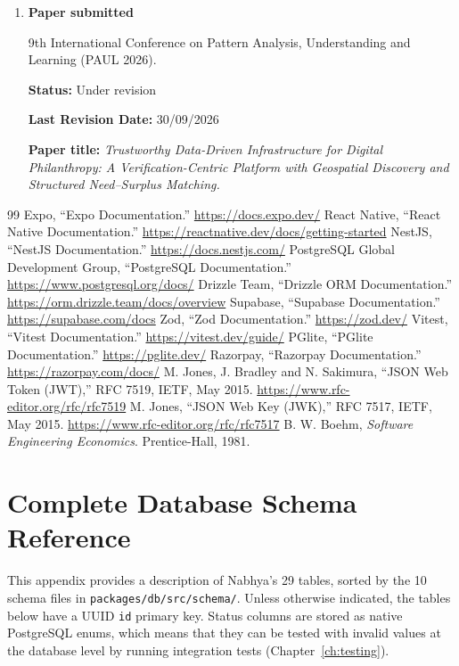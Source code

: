 \begin{enumerate}[leftmargin=*, label=\arabic*.]
  \item \textbf{Paper submitted}

  9th International Conference on Pattern Analysis, Understanding and Learning (PAUL 2026).

  \textbf{Status:} Under revision

  \textbf{Last Revision Date:} 30/09/2026

  \textbf{Paper title:} \textit{Trustworthy Data-Driven Infrastructure for Digital Philanthropy: A Verification-Centric Platform with Geospatial Discovery and Structured Need--Surplus Matching.}
\end{enumerate}

\clearpage{}
\begin{thebibliography}{99}
 Expo, ``Expo Documentation.'' \url{https://docs.expo.dev/}
 React Native, ``React Native Documentation.'' \url{https://reactnative.dev/docs/getting-started}
 NestJS, ``NestJS Documentation.'' \url{https://docs.nestjs.com/}
 PostgreSQL Global Development Group, ``PostgreSQL Documentation.'' \url{https://www.postgresql.org/docs/}
 Drizzle Team, ``Drizzle ORM Documentation.'' \url{https://orm.drizzle.team/docs/overview}
 Supabase, ``Supabase Documentation.'' \url{https://supabase.com/docs}
 Zod, ``Zod Documentation.'' \url{https://zod.dev/}
 Vitest, ``Vitest Documentation.'' \url{https://vitest.dev/guide/}
 PGlite, ``PGlite Documentation.'' \url{https://pglite.dev/}
 Razorpay, ``Razorpay Documentation.'' \url{https://razorpay.com/docs/}
 M. Jones, J. Bradley and N. Sakimura, ``JSON Web Token (JWT),'' RFC 7519, IETF, May 2015. \url{https://www.rfc-editor.org/rfc/rfc7519}
 M. Jones, ``JSON Web Key (JWK),'' RFC 7517, IETF, May 2015. \url{https://www.rfc-editor.org/rfc/rfc7517}
 B. W. Boehm, \emph{Software Engineering Economics}. Prentice-Hall, 1981.
\end{thebibliography}

\appendix
\renewcommand{\thechapter}{\Alph{chapter}}

\chapter[Complete Database Schema Reference]{Complete Database Schema Reference}
\label{app:schema}
This appendix provides a description of Nabhya's 29 tables, sorted by the 10 schema files in \texttt{packages/\allowbreak db/\allowbreak src/\allowbreak schema/}. Unless otherwise indicated, the tables below have a UUID \texttt{id} primary key. Status columns are stored as native PostgreSQL enums, which means that they can be tested with invalid values at the database level by running integration tests (Chapter~\ref{ch:testing}).

